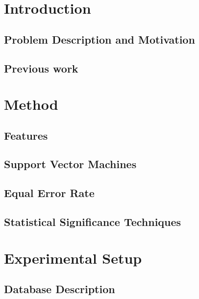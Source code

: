\documentclass[11pt,a4paper]{tesis}
\begin{document}
\linespread{1.6}
\tableofcontents
\chapter{Introduction}
	\section{Problem Description and Motivation}
	\section{Previous work}
		
\chapter{Method}
	
	\section{Features}
		
		
		
	\section{Support Vector Machines}
		
	\section{Equal Error Rate}
		
	\section{Statistical Significance Techniques}
		
		

\chapter{Experimental Setup}
	
	\section{Database Description}
		
\end{document}
